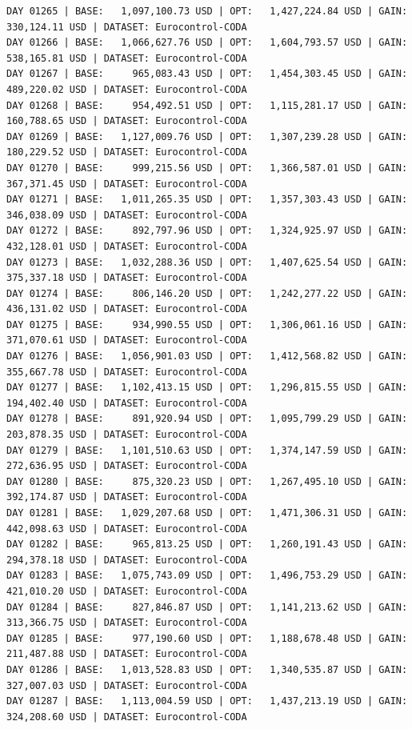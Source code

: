 \documentclass[11pt,a4paper]{article}
\begin{document}
\begin{verbatim}
DAY 01265 | BASE:   1,097,100.73 USD | OPT:   1,427,224.84 USD | GAIN: 330,124.11 USD | DATASET: Eurocontrol-CODA
DAY 01266 | BASE:   1,066,627.76 USD | OPT:   1,604,793.57 USD | GAIN: 538,165.81 USD | DATASET: Eurocontrol-CODA
DAY 01267 | BASE:     965,083.43 USD | OPT:   1,454,303.45 USD | GAIN: 489,220.02 USD | DATASET: Eurocontrol-CODA
DAY 01268 | BASE:     954,492.51 USD | OPT:   1,115,281.17 USD | GAIN: 160,788.65 USD | DATASET: Eurocontrol-CODA
DAY 01269 | BASE:   1,127,009.76 USD | OPT:   1,307,239.28 USD | GAIN: 180,229.52 USD | DATASET: Eurocontrol-CODA
DAY 01270 | BASE:     999,215.56 USD | OPT:   1,366,587.01 USD | GAIN: 367,371.45 USD | DATASET: Eurocontrol-CODA
DAY 01271 | BASE:   1,011,265.35 USD | OPT:   1,357,303.43 USD | GAIN: 346,038.09 USD | DATASET: Eurocontrol-CODA
DAY 01272 | BASE:     892,797.96 USD | OPT:   1,324,925.97 USD | GAIN: 432,128.01 USD | DATASET: Eurocontrol-CODA
DAY 01273 | BASE:   1,032,288.36 USD | OPT:   1,407,625.54 USD | GAIN: 375,337.18 USD | DATASET: Eurocontrol-CODA
DAY 01274 | BASE:     806,146.20 USD | OPT:   1,242,277.22 USD | GAIN: 436,131.02 USD | DATASET: Eurocontrol-CODA
DAY 01275 | BASE:     934,990.55 USD | OPT:   1,306,061.16 USD | GAIN: 371,070.61 USD | DATASET: Eurocontrol-CODA
DAY 01276 | BASE:   1,056,901.03 USD | OPT:   1,412,568.82 USD | GAIN: 355,667.78 USD | DATASET: Eurocontrol-CODA
DAY 01277 | BASE:   1,102,413.15 USD | OPT:   1,296,815.55 USD | GAIN: 194,402.40 USD | DATASET: Eurocontrol-CODA
DAY 01278 | BASE:     891,920.94 USD | OPT:   1,095,799.29 USD | GAIN: 203,878.35 USD | DATASET: Eurocontrol-CODA
DAY 01279 | BASE:   1,101,510.63 USD | OPT:   1,374,147.59 USD | GAIN: 272,636.95 USD | DATASET: Eurocontrol-CODA
DAY 01280 | BASE:     875,320.23 USD | OPT:   1,267,495.10 USD | GAIN: 392,174.87 USD | DATASET: Eurocontrol-CODA
DAY 01281 | BASE:   1,029,207.68 USD | OPT:   1,471,306.31 USD | GAIN: 442,098.63 USD | DATASET: Eurocontrol-CODA
DAY 01282 | BASE:     965,813.25 USD | OPT:   1,260,191.43 USD | GAIN: 294,378.18 USD | DATASET: Eurocontrol-CODA
DAY 01283 | BASE:   1,075,743.09 USD | OPT:   1,496,753.29 USD | GAIN: 421,010.20 USD | DATASET: Eurocontrol-CODA
DAY 01284 | BASE:     827,846.87 USD | OPT:   1,141,213.62 USD | GAIN: 313,366.75 USD | DATASET: Eurocontrol-CODA
DAY 01285 | BASE:     977,190.60 USD | OPT:   1,188,678.48 USD | GAIN: 211,487.88 USD | DATASET: Eurocontrol-CODA
DAY 01286 | BASE:   1,013,528.83 USD | OPT:   1,340,535.87 USD | GAIN: 327,007.03 USD | DATASET: Eurocontrol-CODA
DAY 01287 | BASE:   1,113,004.59 USD | OPT:   1,437,213.19 USD | GAIN: 324,208.60 USD | DATASET: Eurocontrol-CODA

\end{verbatim}
\end{document}
